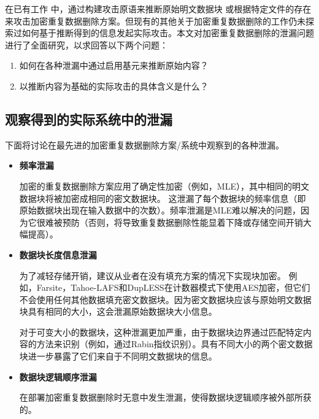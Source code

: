 在已有工作 中，通过构建攻击原语来推断原始明文数据块 或根据特定文件的存在来攻击加密重复数据删除方案。但现有的其他关于加密重复数据删除的工作仍未探索过如何基于推断得到的信息发起实际攻击。本文对加密重复数据删除的泄漏问题进行了全面研究，以求回答以下两个问题：
\begin{enumerate}
    \item 如何在各种泄漏中通过启用基元来推断原始内容？
    \item 以推断内容为基础的实际攻击的具体含义是什么？
\end{enumerate}

\subsection{观察得到的实际系统中的泄漏}

下面将讨论在最先进的加密重复数据删除方案/系统中观察到的各种泄漏。


\begin{itemize}
    \item \textbf{频率泄漏}
    
    加密的重复数据删除方案应用了确定性加密（例如，MLE），其中相同的明文数据块将被加密成相同的密文数据块。 这泄漏了每个数据块的频率信息（即原始数据块出现在输入数据中的次数）。频率泄漏是MLE难以解决的问题，因为它很难被预防（否则，将导致重复数据删除性能显着下降或存储空间开销大幅提高）。
    \item \textbf{数据块长度信息泄漏}
    
    为了减轻存储开销，建议从业者在没有填充方案的情况下实现块加密。 例如，Farsite，Tahoe-LAFS和DupLESS在计数器模式下使用AES加密，但它们不会使用任何其他数据填充密文数据块。因为密文数据块应该与原始明文数据块具有相同的大小，这会泄漏原始数据块大小信息。
    
    对于可变大小的数据块，这种泄漏更加严重，由于数据块边界通过匹配特定内容的方法来识别（例如，通过Rabin指纹识别）。具有不同大小的两个密文数据块进一步暴露了它们来自于不同明文数据块的信息。
    
    \item \textbf{数据块逻辑顺序泄漏}

    在部署加密重复数据删除时无意中发生泄漏，使得数据块逻辑顺序被外部所获的。
\end{itemize}

